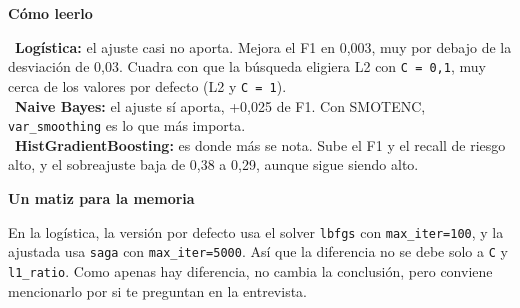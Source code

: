 \documentclass[11pt,a4paper]{article}
\begin{document}
{\smallskip\noindent\textbf{Cómo leerlo}\par
\hspace*{1.0em}\textbullet~\textbf{Logística:} el ajuste casi no aporta. Mejora el F1 en 0,003, muy por debajo de la desviación de 0,03. Cuadra con que la búsqueda eligiera L2 con \texttt{C = 0,1}, muy cerca de los valores por defecto (L2 y \texttt{C = 1}). \\{}
\hspace*{1.0em}\textbullet~\textbf{Naive Bayes:} el ajuste sí aporta, +0,025 de F1. Con SMOTENC, \texttt{var\_\allowbreak{}smoothing} es lo que más importa. \\{}
\hspace*{1.0em}\textbullet~\textbf{HistGradientBoosting:} es donde más se nota. Sube el F1 y el recall de riesgo alto, y el sobreajuste baja de 0,38 a 0,29, aunque sigue siendo alto.

\smallskip\noindent\textbf{Un matiz para la memoria}\par
En la logística, la versión por defecto usa el solver \texttt{lbfgs} con \texttt{max\_\allowbreak{}iter=100}, y la ajustada usa \texttt{saga} con \texttt{max\_\allowbreak{}iter=5000}. Así que la diferencia no se debe solo a \texttt{C} y \texttt{l1\_\allowbreak{}ratio}. Como apenas hay diferencia, no cambia la conclusión, pero conviene mencionarlo por si te preguntan en la entrevista.

}
\end{document}
